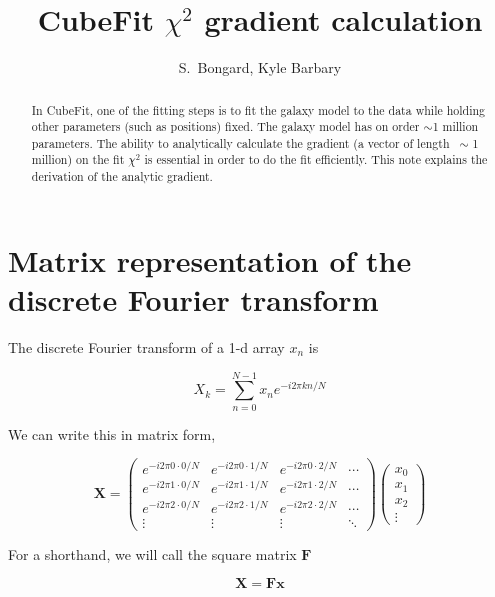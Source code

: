 \documentclass[12pt]{article}
\begin{document}
\title{CubeFit $\chi^2$ gradient calculation}
\author{S.~Bongard, Kyle Barbary}
\maketitle
\begin{abstract}
In CubeFit, one of the fitting steps is to fit the galaxy model to the
data while holding other parameters (such as positions) fixed. The
galaxy model has on order $\sim$1 million parameters. The ability to
analytically calculate the gradient (a vector of length ~$\sim$ 1
million) on the fit $\chi^2$ is essential in order to do the fit
efficiently. This note explains the derivation of the analytic
gradient.
\end{abstract}

\section{Matrix representation of the discrete Fourier transform}

The discrete Fourier transform of a 1-d array $x_n$ is

\begin{equation}
X_k = \sum_{n=0}^{N-1} x_n e^{-i 2 \pi k n / N}
\end{equation}

We can write this in matrix form,

\begin{equation}
\mathbf{X} = \left( \begin{array}{cccc}
   e^{-i 2\pi 0 \cdot 0 / N} & e^{-i 2\pi 0\cdot 1 / N} & e^{-i 2\pi 0 \cdot 2 / N} & \cdots \\
   e^{-i 2\pi 1 \cdot 0 / N} & e^{-i 2\pi 1 \cdot1 / N} & e^{-i 2\pi 1 \cdot 2 / N} & \cdots \\
   e^{-i 2\pi 2 \cdot 0 / N} & e^{-i 2\pi 2 \cdot 1 / N} & e^{-i 2\pi 2 \cdot 2 / N} & \cdots \\
   \vdots & \vdots & \vdots & \ddots
   \end{array} \right)
   \left( \begin{array}{c} x_0 \\ x_1 \\ x_2 \\ \vdots \end{array} \right)
\end{equation}

For a shorthand, we will call the square matrix $\mathbf{F}$

\begin{equation}
\mathbf{X} = \mathbf{F} \mathbf{x}
\end{equation}
\end{document}
